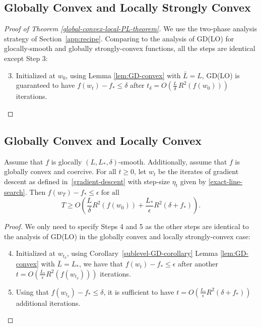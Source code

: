 \documentclass[10pt]{article} %
\begin{document}
\subsection{Globally Convex and Locally Strongly Convex}
\label{global-convex}
\begin{proof}[Proof of Theorem \ref{global-convex-local-PL-theorem}]
    We use the two-phase analysis strategy of Section~\ref{app:recipe}. Comparing to the analysis of GD(LO) for glocally-smooth and globally strongly-convex functions, all the steps are identical except Step 3:
    \begin{enumerate}
    \setcounter{enumi}{2}
    \item Initialized at $w_0$, using Lemma \ref{lem:GD-convex} with $\bar{L} = L$, GD(LO) is guaranteed to have $f(w_t) - f_{*} \leq \delta$ after $t_\delta = O\left(\frac{L}{\delta} \, R^2(f(w_0))\right)$ iterations.
    \end{enumerate}
\end{proof}
\subsection{Globally Convex and Locally Convex} \label{global-convex-proof} %
\begin{theorem}
    \label{global-convex-theorem}
    Assume that $f$ is glocally $(L, L_*, \delta)$-smooth. Additionally, assume that $f$ is globally convex and coercive. For all $t \geq 0$, let $w_t$ be the iterates of gradient descent as defined in~\eqref{gradient-descent} with step-size $\eta_t$ given by \eqref{exact-line-search}. Then $f(w_T) - f_* \leq \epsilon \;\text{for all}$
    \begin{equation*}
     T \geq O\left(\frac{L}{\delta}R^2(f(w_{0})) + \frac{L_{*}}{\epsilon}R^2(
     \delta + f_{*})\right).
    \end{equation*}
\end{theorem}
\begin{proof}
    We only need to specify Steps 4 and 5 as the other steps are identical to the analysis of GD(LO) in the globally convex and locally strongly-convex case:
    \begin{enumerate}
    \setcounter{enumi}{3}
    \item Initialized at $w_{t_\delta}$, using Corollary~\ref{sublevel-GD-corollary} Lemma \ref{lem:GD-convex} with $\bar{L} = L_{*}$, we have that $f(w_t) - f_{*} \leq \epsilon$ after another $t = O\left(\frac{L_*}{\epsilon}R^2(f(w_{t_\delta}))\right)$ iterations.
    \item Using that $f(w_{t_\delta}) - f_* \leq \delta$, it is sufficient to have $t = O\left(\frac{L_*}{\epsilon}R^2(\delta + f_{*})\right)$ additional iterations.
    \end{enumerate}
\end{proof}
\fi
\end{document}
